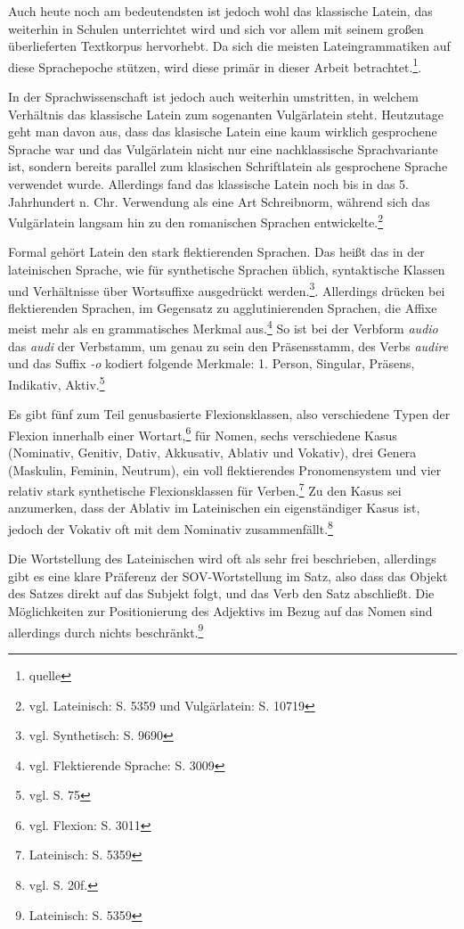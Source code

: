\documentclass[12pt,abstract=on,titlepage,bibliography=totoc,ngerman,listof=totoc]{scrreprt}
\begin{document}
Auch heute noch am bedeutendsten ist jedoch wohl das klassische Latein, das weiterhin in Schulen unterrichtet wird und sich vor allem mit seinem großen überlieferten Textkorpus hervorhebt. Da sich die meisten Lateingrammatiken auf diese Sprachepoche stützen, wird diese primär in dieser Arbeit betrachtet.\footnote{quelle}. \par
In der Sprachwissenschaft ist jedoch auch weiterhin umstritten, in welchem Verhältnis das klassische Latein zum sogenanten Vulgärlatein steht. Heutzutage geht man davon aus, dass das klasische Latein eine kaum wirklich gesprochene Sprache war und das Vulgärlatein nicht nur eine nachklassische Sprachvariante ist, sondern bereits parallel zum klasischen Schriftlatein als gesprochene Sprache verwendet wurde. Allerdings fand das klassische Latein noch bis in das 5. Jahrhundert n. Chr. Verwendung als eine Art Schreibnorm, während sich das Vulgärlatein langsam hin zu den romanischen Sprachen entwickelte.\footnote{vgl. \cite{METZLER2004} Lateinisch: S. 5359 und Vulgärlatein: S. 10719} \par
Formal gehört Latein den stark flektierenden Sprachen. Das heißt das in der lateinischen Sprache, wie für synthetische Sprachen üblich, syntaktische Klassen und Verhältnisse über Wortsuffixe ausgedrückt werden.\footnote{vgl. \cite{METZLER2004} Synthetisch: S. 9690}. Allerdings drücken bei flektierenden Sprachen, im Gegensatz zu agglutinierenden Sprachen, die Affixe meist mehr als en grammatisches Merkmal aus.\footnote{vgl. \cite{METZLER2004} Flektierende Sprache: S. 3009} So ist bei der Verbform \textit{audio} das \textit{audi} der Verbstamm, um genau zu sein den Präsensstamm, des Verbs \textit{audire} und das Suffix \textit{-o} kodiert folgende Merkmale: 1. Person, Singular, Präsens, Indikativ, Aktiv.\footnote{vgl. \cite{BAYER-LINDAUER1994} S. 75} \par
Es gibt fünf zum Teil genusbasierte Flexionsklassen, also verschiedene Typen der Flexion innerhalb einer Wortart,\footnote{vgl. \cite{METZLER2004} Flexion: S. 3011} für Nomen, sechs verschiedene Kasus (Nominativ, Genitiv, Dativ, Akkusativ, Ablativ und Vokativ), drei Genera (Maskulin, Feminin, Neutrum), ein voll flektierendes Pronomensystem und vier relativ stark synthetische Flexionsklassen für Verben.\footnote{\cite{METZLER2004} Lateinisch: S. 5359} Zu den Kasus sei anzumerken, dass der Ablativ im Lateinischen ein eigenständiger Kasus ist, jedoch der Vokativ oft mit dem Nominativ zusammenfällt.\footnote{vgl. \cite{BAYER-LINDAUER1994} S. 20f.} \par
Die Wortstellung des Lateinischen wird oft als sehr frei beschrieben, allerdings gibt es eine klare Präferenz der SOV-Wortstellung im Satz, also dass das Objekt des Satzes direkt auf das Subjekt folgt, und das Verb den Satz abschließt. Die Möglichkeiten zur Positionierung des Adjektivs im Bezug auf das Nomen sind allerdings durch nichts beschränkt.\footnote{\cite{METZLER2004} Lateinisch: S. 5359}
\end{document}
